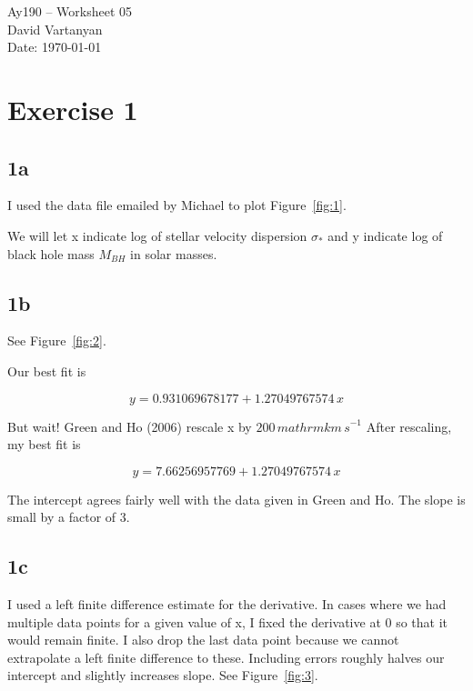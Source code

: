 \documentclass[11pt,letterpaper]{article}
\begin{document}
\begin{center}
\Large
Ay190 -- Worksheet 05\\
David Vartanyan\\
Date: \today
\end{center}

\section{Exercise 1}

\subsection{1a}
I used the data file emailed by Michael to plot Figure~\ref{fig:1}.

We will let x indicate log of stellar velocity dispersion $\sigma_*$ and y indicate log of black hole mass $M_{BH}$ in solar masses.


\subsection{1b}

See Figure~\ref{fig:2}.

Our best fit is

\begin{equation}
y=0.931069678177+ 1.27049767574\,x
\end{equation}

But wait! Green and Ho (2006) rescale x by $200 \,mathrm{km\, s}^{-1}$
After rescaling, my best fit is

\begin{equation}
y=7.66256957769+ 1.27049767574\, x
\end{equation} 

The intercept agrees fairly well with the data given in Green and Ho. The slope is small by a factor of 3.

\subsection{1c}

I used a left finite difference estimate for the derivative. In cases where we had multiple data points for a given value of x, I fixed the derivative at 0 so that it would remain finite. I also drop the last data point because we cannot extrapolate a left finite difference to these. Including errors roughly halves our intercept and slightly increases slope. See Figure~\ref{fig:3}.
\end{document}
